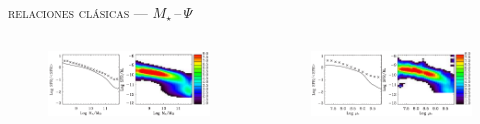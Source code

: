 \documentclass[xcolor=dvipsnames,fleqn,hyperref={colorlinks,citecolor=black,linkcolor=black,urlcolor=black}]{beamer}
\begin{document}
\begin{frame}{\textsc{relaciones clásicas --- $M_\star\,$--$\,\Psi$}}

\begin{columns}
\begin{figure}
\includegraphics[scale=0.7]{img/brinchmann2004-24}
\end{figure}

\begin{figure}
\includegraphics[scale=0.7]{img/brinchmann2004-25}
\end{figure}

\end{columns}
\end{frame}
\end{document}
